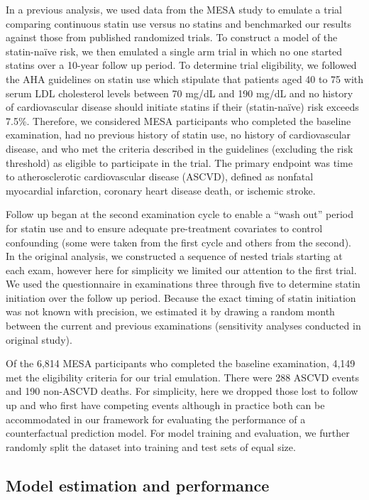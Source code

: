 In a previous analysis, we used data from the MESA study to emulate a trial comparing continuous statin use versus no statins and benchmarked our results against those from published randomized trials. To construct a model of the statin-na\"{i}ve risk, we then emulated a single arm trial in which no one started statins over a 10-year follow up period. To determine trial eligibility, we followed the AHA guidelines \cite{grundy_scott_m_2018_2019} on statin use which stipulate that patients aged 40 to 75 with serum LDL cholesterol levels between 70 mg/dL and 190 mg/dL and no history of cardiovascular disease should initiate statins if their (statin-na\"{i}ve) risk exceeds 7.5\%. Therefore, we considered MESA participants who completed the baseline examination, had no previous history of statin use, no history of cardiovascular disease, and who met the criteria described in the guidelines (excluding the risk threshold) as eligible to participate in the trial. The primary endpoint was time to atherosclerotic cardiovascular disease (ASCVD), defined as nonfatal myocardial infarction, coronary heart disease death, or ischemic stroke. 

Follow up began at the second examination cycle to enable a ``wash out'' period for statin use and to ensure adequate pre-treatment covariates to control confounding (some were taken from the first cycle and others from the second). In the original analysis, we constructed a sequence of nested trials starting at each exam, however here for simplicity we limited our attention to the first trial. We used the questionnaire in examinations three through five to determine statin initiation over the follow up period. Because the exact timing of statin initiation was not known with precision, we estimated it by drawing a random month between the current and previous examinations (sensitivity analyses conducted in original study).

Of the 6,814 MESA participants who completed the baseline examination, 4,149 met the eligibility criteria for our trial emulation. There were 288 ASCVD events and 190 non-ASCVD deaths. For simplicity, here we dropped those lost to follow up and who first have competing events although in practice both can be accommodated in our framework for evaluating the performance of a counterfactual prediction model. For model training and evaluation, we further randomly split the dataset into training and test sets of equal size. 

\subsection{Model estimation and performance}


